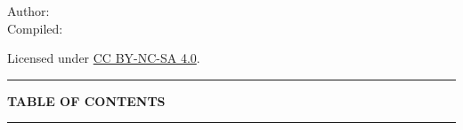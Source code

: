 \documentclass[12pt, a4paper, openright]{report}
\begin{document}
\vfill

\begin{center}
  {\small\color{white!50}Author: \textit{\NoteAuthor}}\\[0.3em]
  {\small\color{white!50}Compiled: \textit{\CompileDate}}

  {
    \vspace*{1em}
    \small \color{white!50}
    Licensed under \href{https://creativecommons.org/licenses/by-nc-sa/4.0/}{CC BY-NC-SA 4.0}.\\
    \vspace{0.5em}
  }
\end{center}

\clearpage
\pagestyle{fancy}

\begin{center}
  {\color{StarGold}\rule{0.4\textwidth}{0.5pt}}
\end{center}
\vspace{0.8cm}
{\centering\Large\bfseries\color{DeepSpace}TABLE OF CONTENTS\par}
\vspace{0.8cm}
\begin{center}
  {\color{StarGold}\rule{0.4\textwidth}{0.5pt}}
\end{center}
\vspace{1.2cm}
{%
  \hypersetup{linkcolor=DeepSpace}%
  \makeatletter{}\makeatother
}
\clearpage


\end{document}
